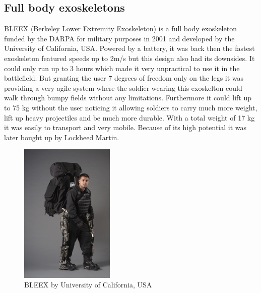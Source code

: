 \documentclass[letterpaper, 10 pt, conference]{ieeeconf}  %
\begin{document}
\subsection{Full body exoskeletons}

BLEEX (Berkeley Lower Extremity Exoskeleton) is a full body exoskeleton funded by the DARPA for military purposes in 2001 and developed by the University of California, USA. Powered by a battery, it was back then the fastest exoskeleton featured speeds up to 2m/s but this design also had its downsides. It could only run up to 3 hours which made it very unpractical to use it in the battlefield. But granting the user 7 degrees of freedom only on the legs it was providing a very agile system where the soldier wearing this exoskelton could walk through bumpy fields without any limitations. Furthermore it could lift up to 75 kg without the user noticing it allowing soldiers to carry much more weight, lift up heavy projectiles and be much more durable. With a total weight of 17 kg it was easily to transport and very mobile. Because of its high potential it was later bought up by Lockheed Martin. \newpage



\begin{figure}[H]
  \centering
    \includegraphics[width=0.4\textwidth]{img/bleex}
  \caption{BLEEX by University of California, USA}
\end{figure} 

\end{document}
